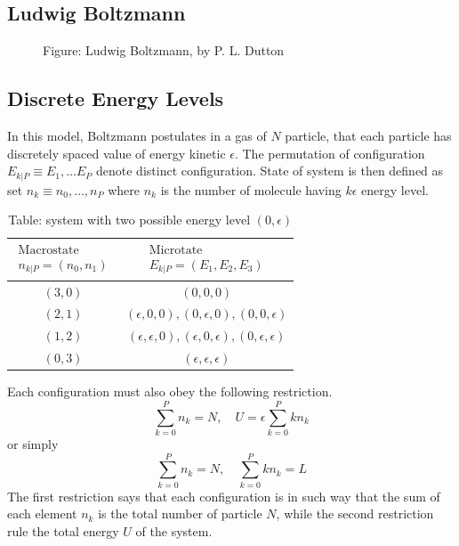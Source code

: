 \documentclass[../../../Main.tex]{subfiles}
\begin{document}
\subsection{Ludwig Boltzmann}
\begin{figure}[h]
    \centering
    \caption*{Figure: Ludwig Boltzmann, by P. L. Dutton}
\end{figure}
\subsection{Discrete Energy Levels}
In this model, Boltzmann postulates in a gas of $N$ particle, that each particle has discretely spaced value of energy kinetic $\epsilon$. The permutation of configuration $E_{k|P}\equiv E_1,\dots E_P$ denote distinct configuration. State of system is then defined as set $n_k\equiv n_0,\dots, n_P$ where $n_k$ is the number of molecule having $k\epsilon$ energy level.

\begin{table}[h]
    \centering
    \caption*{Table: system with two possible energy level $(0, \epsilon)$}
    \begin{tabular}{cc} 
        \toprule
        $\begin{array}{c}\text{Macrostate} \\n_{k|P}=(n_0,n_1)\end{array}$  &  $\begin{array}{c}\text{Microtate} \\ E_{k|P}=(E_1 , E_2 , E_3 )\end{array}$ \\
        \midrule
        $(3, 0)$&$(0, 0, 0)$\\
        $(2, 1)$&$(\epsilon, 0, 0), (0, \epsilon, 0), (0, 0, \epsilon)$\\
        $(1, 2)$&$(\epsilon, \epsilon, 0), (\epsilon, 0, \epsilon), (0, \epsilon, \epsilon)$\\
        $(0, 3)$&$(\epsilon, \epsilon, \epsilon)$\\
        \bottomrule
    \end{tabular}
\end{table}

Each configuration must also obey the following restriction.
\begin{equation*}
    \sum_{k=0}^{P}n_k=N,\quad U=\epsilon\sum_{k=0}^{P} kn_k
\end{equation*}
or simply
\begin{equation*}
    \sum_{k=0}^{P}n_k=N,\quad \sum_{k=0}^{P} kn_k=L
\end{equation*}
The first restriction says that each configuration is in such way that the sum of each element $n_k$ is the total number of particle $N$, while the second restriction rule the total energy $U$ of the system.
\end{document}
